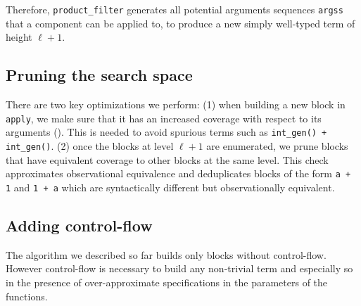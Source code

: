 \documentclass[review, sigplan]{acmart}
\begin{document}
Therefore, \lstinline[basicstyle=\small\ttfamily]|product_filter|
generates all potential arguments sequences \lstinline[basicstyle=\small\ttfamily]|argss|
that a component can be applied to, to produce a new simply well-typed
term of height $\ell + 1$.

\subsection{Pruning the search space}
There are two key optimizations we perform:
(1) when building a new block in \lstinline[basicstyle=\small\ttfamily]|apply|,
we make sure that it has an increased coverage with respect to its arguments ().
This is needed to avoid spurious terms such as
\lstinline[basicstyle=\small\ttfamily]|int_gen() + int_gen()|.
(2) once the blocks at level $\ell + 1$ are enumerated,
we prune blocks that have equivalent coverage to other blocks at the same
level.
This check approximates observational equivalence and deduplicates
blocks of the form \lstinline[basicstyle=\small\ttfamily]|a + 1|
and \lstinline[basicstyle=\small\ttfamily]|1 + a| which are
syntactically different but observationally equivalent.

\subsection{Adding control-flow}

The algorithm we described so far builds only blocks without
control-flow.
However control-flow is necessary to build any non-trivial term and
especially so in the presence of over-approximate specifications
in the parameters of the functions.
\end{document}
